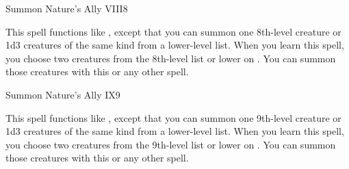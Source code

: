 \begin{spellsection}{Summon Nature's Ally VIII}{8}
    \begin{spellheader}
    \end{spellheader}
    \begin{spellcontent}
        \begin{spelltargetinginfo}
        \end{spelltargetinginfo}
        \begin{spelleffects}
            \spellspecial This spell functions like , except that you can summon one 8th-level creature or 1d3 creatures of the same kind from a lower-level list. When you learn this spell, you choose two creatures from the 8th-level list or lower on . You can summon those creatures with this or any other  spell.
            \spelldur \durshort \dismissable
        \end{spelleffects}
    \end{spellcontent}
    \begin{spellfooter}
        \miscastexplode
    \end{spellfooter}
\end{spellsection}

\begin{spellsection}{Summon Nature's Ally IX}{9}
    \begin{spellheader}
    \end{spellheader}
    \begin{spellcontent}
        \begin{spelltargetinginfo}
        \end{spelltargetinginfo}
        \begin{spelleffects}
            \spellspecial This spell functions like , except that you can summon one 9th-level creature or 1d3 creatures of the same kind from a lower-level list. When you learn this spell, you choose two creatures from the 9th-level list or lower on . You can summon those creatures with this or any other  spell.

            \spelldur \durshort \dismissable
        \end{spelleffects}
    \end{spellcontent}
    \begin{spellfooter}
        \miscastexplode
    \end{spellfooter}
\end{spellsection}

